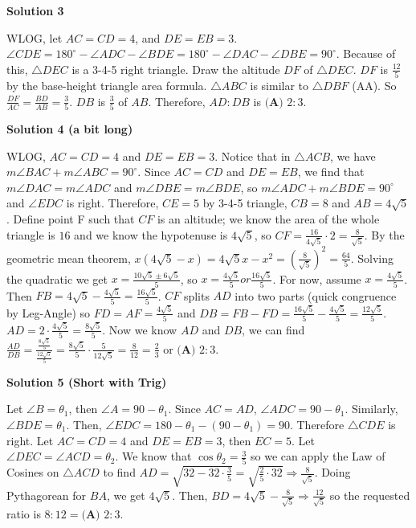 \begin{enumerate}
 



\textbf{Solution 3}

WLOG, let $AC=CD=4$, and $DE=EB=3$. $\angle CDE = 180^{\circ} - \angle ADC - \angle BDE = 180^{\circ} - \angle DAC - \angle DBE = 90^{\circ}$. Because of this, $\triangle DEC$ is a 3-4-5 right triangle. Draw the altitude $DF$ of $\triangle DEC$. $DF$ is $\frac{12}{5}$ by the base-height triangle area formula. $\triangle ABC$ is similar to $\triangle DBF$ (AA).  So $\frac{DF}{AC} = \frac{BD}{AB} = \frac35$. $DB$ is $\frac35$ of $AB$. Therefore, $AD:DB$ is $\boxed{\textbf{(A) } 2:3}$.

 



\textbf{Solution 4 (a bit long)}

WLOG, $AC = CD = 4$ and $DE = EB = 3$. Notice that in $\triangle ACB$, we have $m\angle BAC + m\angle ABC = 90^{\circ}$. Since $AC = CD$ and $DE = EB$, we find that $m\angle DAC = m\angle ADC$ and $m\angle DBE = m\angle BDE$, so $m\angle ADC + m\angle BDE = 90^{\circ}$ and $\angle EDC$ is right. Therefore, $CE = 5$ by 3-4-5 triangle, $CB = 8$ and $AB = 4\sqrt{5}$. Define point F such that $CF$ is an altitude; we know the area of the whole triangle is $16$ and we know the hypotenuse is $4\sqrt{5}$, so $CF = \frac{16}{4\sqrt{5}}\cdot2=\frac{8}{\sqrt{5}}$. By the geometric mean theorem, $x\left(4\sqrt{5}-x\right)=4\sqrt{5}x-x^{2}=\left(\frac{8}{\sqrt{5}}\right)^{2}=\frac{64}{5}$. Solving the quadratic we get $x=\frac{10\sqrt{5}\pm6\sqrt{5}}{5}$, so $x=\frac{4\sqrt{5}}{5} or \frac{16\sqrt{5}}{5}$. For now, assume $x=\frac{4\sqrt{5}}{5}$. Then $FB=4\sqrt{5}-\frac{4\sqrt{5}}{5}=\frac{16\sqrt{5}}{5}$. $CF$ splits $AD$ into two parts (quick congruence by Leg-Angle) so $FD = AF = \frac{4\sqrt{5}}{5}$ and $DB = FB - FD = \frac{16\sqrt{5}}{5}-\frac{4\sqrt{5}}{5}=\frac{12\sqrt{5}}{5}$. $AD = 2\cdot\frac{4\sqrt{5}}{5}=\frac{8\sqrt{5}}{5}$. Now we know $AD$ and $DB$, we can find $\frac{AD}{DB}=\frac{\frac{8\sqrt{5}}{5}}{\frac{12\sqrt{5}}{5}}=\frac{8\sqrt{5}}{5}\cdot\frac{5}{12\sqrt{5}}=\frac{8}{12}=\frac{2}{3}$ or $\boxed{\textbf{(A) } 2:3}$.

 



\textbf{Solution 5 (Short with Trig)}

Let $\angle B=\theta_1$, then $\angle A=90-\theta_1$. Since $AC=AD$, $\angle ADC=90-\theta_1$. Similarly, $\angle BDE=\theta_1$. Then, $\angle EDC=180-\theta_1-(90-\theta_1)=90$. Therefore $\bigtriangleup CDE$ is right. Let $AC=CD=4$ and $DE=EB=3$, then $EC=5$. Let $\angle DEC=\angle ACD=\theta_2$. We know that $\cos \theta_2=\frac{3}{5}$ so we can apply the Law of Cosines on $\bigtriangleup ACD$ to find $AD=\sqrt{32-32\cdot{\frac{3}{5}}}=\sqrt{\frac{2}{5}\cdot{32}} \Longrightarrow \frac{8}{\sqrt{5}}$. Doing Pythagorean for $BA$, we get $4\sqrt{5}$. Then, $BD=4\sqrt{5}-\frac{8}{\sqrt{5}} \Longrightarrow \frac{12}{\sqrt{5}}$ so the requested ratio is $8:12=\boxed{\textbf{(A) } 2:3}$.


\end{enumerate}
